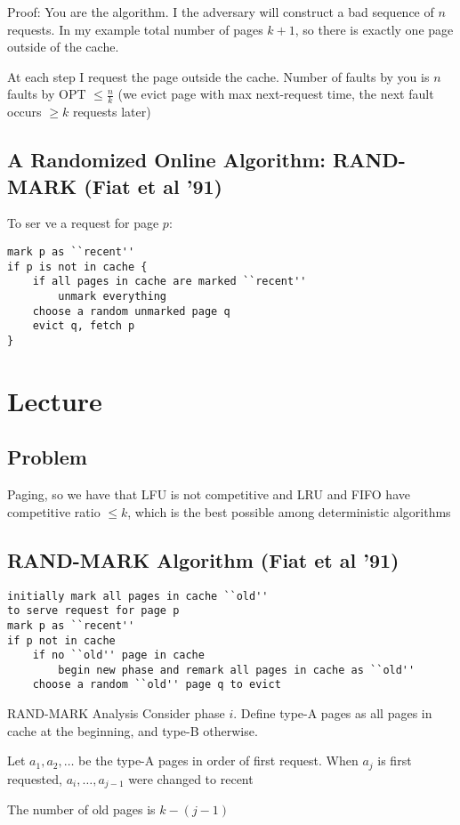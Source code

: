 \documentclass[english,12pt]{article}
\theoremstyle{plain}
\theoremstyle{definition}
\theoremstyle{definition} %
\begin{document}
Proof: You are the algorithm.  I the adversary will construct a bad sequence of $n$ requests.  In my example total number of pages $k+1$, so there is exactly one page outside of the cache.

At each step I request the page outside the cache.
Number of faults by you is $n$
faults by OPT $\le \frac{n}{k}$
(we evict page with max next-request time, the next fault occurs $\ge k$ requests later)

\subsection{A Randomized Online Algorithm: RAND-MARK (Fiat et al '91)}
To ser ve a request for page $p$:
\begin{verbatim}
mark p as ``recent''
if p is not in cache {
    if all pages in cache are marked ``recent''
        unmark everything
    choose a random unmarked page q
    evict q, fetch p
}
\end{verbatim}

\section{Lecture}
\subsection{Problem}
Paging,  so we have that LFU is not competitive and LRU and FIFO have competitive ratio $\le k$, which is the best possible among deterministic algorithms

\subsection{RAND-MARK Algorithm (Fiat et al '91)}
\begin{verbatim}
initially mark all pages in cache ``old''
to serve request for page p
mark p as ``recent''
if p not in cache
    if no ``old'' page in cache
        begin new phase and remark all pages in cache as ``old''
    choose a random ``old'' page q to evict
\end{verbatim}

RAND-MARK Analysis
Consider phase $i$.  Define type-A pages as all pages in cache at the beginning, and type-B otherwise.

Let $a_1,a_2,\ldots$ be the type-A pages in order of first request.  When $a_j$ is first requested, $a_i,\ldots, a_{j-1}$ were changed to recent 


The number of old pages is $k-(j-1)$
\end{document}
